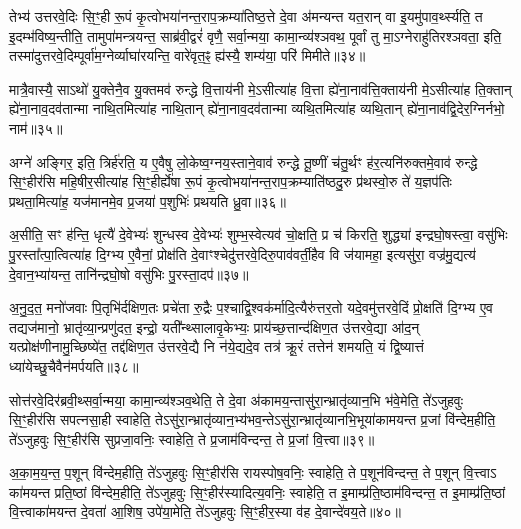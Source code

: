 {\anuvakamend[{यात॒वै ह॑वि॒र्धान॑ञ्च प॒शून्पा॒प्मना॒\-ऽष्टाद॑श च॥६॥}]}

तेभ्य॑ उत्तरवे॒दिः सि॒ꣳ॒ही रू॒पं कृ॒त्वोभया॑नन्त॒राप॒क्रम्या॑तिष्ठ॒त्ते दे॒वा अ॑मन्यन्त यत॒रान् वा इ॒यमु॑पाव॒र्थ्स्यति॒ त इ॒दम्भ॑विष्य॒न्तीति॒ तामुपा॑मन्त्रयन्त॒ साब्र॑वी॒द्वरं॑ वृणै॒ सर्वा॒न्मया॒ कामा॒न्व्य॑श्ञवथ॒ पूर्वां तु मा॒\-ऽग्नेराहु॑तिरश्ञवता॒ इति॒ तस्मा॑दुत्तरवे॒दिम्पूर्वा॑म॒ग्नेर्व्याघा॑रयन्ति॒ वारे॑वृत॒ꣴ॒ ह्य॑स्यै॒ शम्य॑या॒ परि॑ मिमीते॥३४॥

मात्रै॒वास्यै॒ सा\-ऽथो॑ यु॒क्तेनै॒व यु॒क्तमव॑ रुन्द्धे वि॒त्ताय॑नी मे॒\-ऽसीत्या॑ह वि॒त्ता ह्ये॑ना॒नाव॑त्ति॒क्ताय॑नी मे॒\-ऽसीत्या॑ह ति॒क्तान् ह्ये॑ना॒नाव॒दव॑तान्मा नाथि॒तमित्या॑ह नाथि॒तान् ह्ये॑ना॒नाव॒दव॑तान्मा व्यथि॒तमित्या॑ह व्यथि॒तान् ह्ये॑ना॒नाव॑द्वि॒देर॒ग्निर्नभो॒ नाम॑॥३५॥

अग्ने॑ अङ्गिर॒ इति॒ त्रिर्\mbox{}ह॑रति॒ य ए॒वैषु लो॒केष्व॒ग्नय॒स्ताने॒वाव॑ रुन्द्धे तू॒ष्णीं च॑तु॒र्थꣳ ह॑र॒त्यनि॑रुक्तमे॒वाव॑ रुन्द्धे सि॒ꣳ॒हीर॑सि महि॒षीर॒सीत्या॑ह सि॒ꣳ॒हीर्\mbox{}ह्ये॑षा रू॒पं कृ॒त्वोभया॑नन्त॒राप॒क्रम्याति॑ष्ठदु॒रु प्र॑थस्वो॒रु ते॑ य॒ज्ञप॑तिः प्रथता॒मित्या॑ह॒ यज॑मानमे॒व प्र॒जया॑ प॒शुभिः॑ प्रथयति ध्रु॒वा॥३६॥

अ॒सीति॒ सꣳ ह॑न्ति॒ धृत्यै॑ दे॒वेभ्यः॑ शुन्धस्व दे॒वेभ्यः॑ शुम्भ॒स्वेत्यव॑ चो॒क्षति॒ प्र च॑ किरति॒ शुद्ध्या॑ इन्द्रघो॒षस्त्वा॒ वसु॑भिः पु॒रस्ता᳚त्पा॒त्वित्या॑ह दि॒ग्भ्य ए॒वैनां॒ प्रोक्ष॑ति दे॒वाꣳश्चेदु॑त्तरवे॒दिरु॒पाव॑वर्ती॒हैव वि ज॑यामहा॒ इत्यसु॑रा॒ वज्र॑मु॒द्यत्य॑ दे॒वान॒भ्या॑यन्त॒ तानि॑न्द्रघो॒षो वसु॑भिः पु॒रस्ता॒दप॑॥३७॥

अ॒नु॒द॒त॒ मनो॑जवाः पि॒तृभि॑र्दक्षिण॒तः प्रचे॑ता रु॒द्रैः प॒श्चाद्वि॒श्वक॑र्मादि॒त्यैरु॑त्तर॒तो यदे॒वमु॑त्तरवे॒दिं प्रो॒क्षति॑ दि॒ग्भ्य ए॒व तद्यज॑मानो॒ भ्रातृ॑व्या॒न्प्रणु॑दत॒ इन्द्रो॒ यती᳚न्थ्सालावृ॒केभ्यः॒ प्राय॑च्छ॒त्तान्द॑क्षिण॒त उ॑त्तरवे॒द्या आ॑द॒न् यत्प्रोक्ष॑णीनामु॒च्छिष्ये॑त॒ तद्द॑क्षिण॒त उ॑त्तरवे॒द्यै नि न॑ये॒द्यदे॒व तत्र॑ क्रू॒रं तत्तेन॑ शमयति॒ यं द्वि॒ष्यात्तं ध्या॑येच्छु॒चैवैन॑मर्पयति॥३८॥

{\anuvakamend[{मि॒मी॒ते॒ नाम॑ ध्रु॒वा\-ऽप॑ शु॒चा त्रीणि॑ च॥७॥}]}

सोत्त॑रवे॒दिर॑ब्रवी॒थ्सर्वा॒न्मया॒ कामा॒न्व्य॑श्ञव॒थेति॒ ते दे॒वा अ॑कामय॒न्तासु॑रा॒न्भ्रातृ॑व्यान॒भि भ॑वे॒मेति॒ ते॑\-ऽजुहवुः सि॒ꣳ॒हीर॑सि सपत्नसा॒ही स्वाहेति॒ ते\-ऽसु॑रा॒न्भ्रातृ॑व्यान॒भ्य॑भव॒न्ते\-ऽसु॑रा॒न्भ्रातृ॑व्यानभि॒भूया॑कामयन्त प्र॒जां वि॑न्देम॒हीति॒ ते॑\-ऽजुहवुः सि॒ꣳ॒हीर॑सि सुप्रजा॒वनिः॒ स्वाहेति॒ ते प्र॒जाम॑विन्दन्त॒ ते प्र॒जां वि॒त्त्वा॥३९॥

अ॒का॒म॒य॒न्त॒ प॒शून् वि॑न्देम॒हीति॒ ते॑\-ऽजुहवुः सि॒ꣳ॒हीर॑सि रायस्पोष॒वनिः॒ स्वाहेति॒ ते प॒शून॑विन्दन्त॒ ते प॒शून् वि॒त्त्वा\-ऽ का॑मयन्त प्रति॒ष्ठां वि॑न्देम॒हीति॒ ते॑\-ऽजुहवुः सि॒ꣳ॒हीर॑स्यादित्य॒वनिः॒ स्वाहेति॒ त इ॒माम्प्र॑ति॒ष्ठाम॑विन्दन्त॒ त इ॒माम्प्र॑ति॒ष्ठां वि॒त्त्वाका॑मयन्त दे॒वता॑ आ॒शिष॒ उपे॑या॒मेति॒ ते॑\-ऽजुहवुः सि॒ꣳ॒हीर॒स्या व॑ह दे॒वान्दे॑वय॒ते॥४०॥

